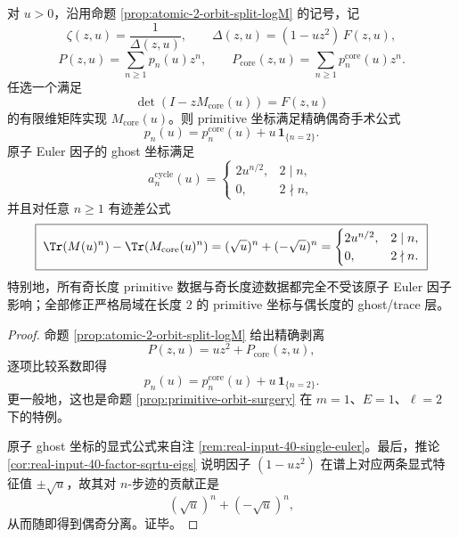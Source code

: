 \begin{theorem}\label{thm:xi-real-input-40-atomic-witt-even-odd-surgery}
对 \(u>0\)，沿用命题 \ref{prop:atomic-2-orbit-split-logM} 的记号，记
\[
\zeta(z,u)=\frac{1}{\Delta(z,u)},
\qquad
\Delta(z,u)=(1-uz^2)\,F(z,u),
\]
\[
P(z,u)=\sum_{n\ge 1}p_n(u)z^n,
\qquad
P_{\mathrm{core}}(z,u)=\sum_{n\ge 1}p_n^{\mathrm{core}}(u)z^n.
\]
任选一个满足
\[
\det(I-zM_{\mathrm{core}}(u))=F(z,u)
\]
的有限维矩阵实现 \(M_{\mathrm{core}}(u)\)。则 primitive 坐标满足精确偶奇手术公式
\[
\boxed{\;
p_n(u)=p_n^{\mathrm{core}}(u)+u\,\mathbf 1_{\{n=2\}}.\;}
\]
原子 Euler 因子的 ghost 坐标满足
\[
a_n^{\mathrm{cycle}}(u)=
\begin{cases}
2u^{n/2},& 2\mid n,\\
0,& 2\nmid n,
\end{cases}
\]
并且对任意 \(n\ge 1\) 有迹差公式
\[
\boxed{\;
\Tr(M(u)^n)-\Tr(M_{\mathrm{core}}(u)^n)
=
(\sqrt u)^n+(-\sqrt u)^n
=
\begin{cases}
2u^{n/2},& 2\mid n,\\
0,& 2\nmid n.
\end{cases}\;}
\]
特别地，所有奇长度 primitive 数据与奇长度迹数据都完全不受该原子 Euler 因子影响；全部修正严格局域在长度 \(2\) 的 primitive 坐标与偶长度的 ghost/trace 层。
\end{theorem}
\begin{proof}
命题 \ref{prop:atomic-2-orbit-split-logM} 给出精确剥离
\[
P(z,u)=u z^2+P_{\mathrm{core}}(z,u),
\]
逐项比较系数即得
\[
p_n(u)=p_n^{\mathrm{core}}(u)+u\,\mathbf 1_{\{n=2\}}.
\]
更一般地，这也是命题 \ref{prop:primitive-orbit-surgery} 在 \(m=1\)、\(E=1\)、\(\ell=2\) 下的特例。
\par
原子 ghost 坐标的显式公式来自注 \ref{rem:real-input-40-single-euler}。最后，推论 \ref{cor:real-input-40-factor-sqrtu-eigs} 说明因子 \((1-uz^2)\) 在谱上对应两条显式特征值 \(\pm\sqrt u\)，故其对 \(n\)-步迹的贡献正是
\[
(\sqrt u)^n+(-\sqrt u)^n,
\]
从而随即得到偶奇分离。证毕。
\end{proof}



